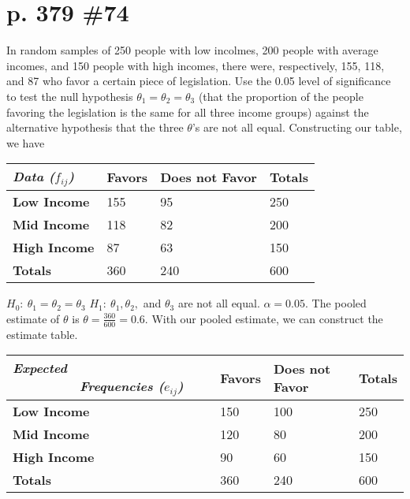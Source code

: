 \documentclass[12pt]{article}
\begin{document}
	\section[20pt]{p. 379 \#74}
	In random samples of 250 people with low incolmes, 200 people with average incomes, and 150 people with high incomes, there were, respectively, 155, 118, and 87 who favor a certain piece of legislation. Use the 0.05 level of significance to test the null hypothesis \(\theta_1 = \theta_2 = \theta_3\) (that the proportion of the people favoring the legislation is the same for all three income groups) against the alternative hypothesis that the three \(\theta\)'s are not all equal.
	\newline \newline
	Constructing our table, we have
	\newline
	\begin{tabular}{|p{3.3cm}|p{2cm}|p{2cm}|p{2cm}|}
			\hline
			\textit{Data (\(f_{ij}\))} & \textbf{Favors} & \textbf{Does not Favor} & \textbf{Totals} \\
	 		\hline
			\textbf{Low Income} & 155 & 95 & 250 \\
			\hline
			\textbf{Mid Income} & 118 & 82 & 200 \\
			\hline
			\textbf{High Income} & 87 & 63 & 150 \\
			\hline
			\textbf{Totals} & 360 & 240 & 600 \\
			\hline
	\end{tabular}
	\newline
	\(H_0:\ \theta_1 = \theta_2 = \theta_3\)
	\newline
	\(H_1:\ \theta_1,\theta_2,\) and \(\theta_3\) are not all equal.
	\newline
	\(\alpha = 0.05\).
	The pooled estimate of \(\theta\) is \(\theta = \frac{360}{600} = 0.6\).
	\newline
	With our pooled estimate, we can construct the estimate table.
	\newline
	\begin{tabular}{|p{3.3cm}|p{2cm}|p{2cm}|p{2cm}|}
			\hline
			\textit{Expected \ \ \ \ \ \ \ \ \ Frequencies (\(e_{ij}\))} & \textbf{Favors} & \textbf{Does not Favor} & \textbf{Totals} \\
	 		\hline
			\textbf{Low Income} & 150 & 100 & 250 \\
			\hline
			\textbf{Mid Income} & 120 & 80 & 200 \\
			\hline
			\textbf{High Income} & 90 & 60 & 150 \\
			\hline
			\textbf{Totals} & 360 & 240 & 600 \\
			\hline
	\end{tabular}
\end{document}
